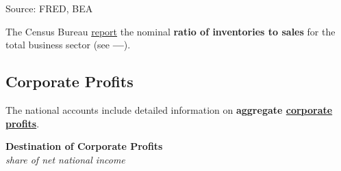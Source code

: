 \documentclass{report}
\makeatletter
\newcommand{\tbllink}[1]{\href{https://raw.githubusercontent.com/bdecon/US-chartbook/master/chartbook/data/#1}{\faTable}}
\newcommand*\short[1]{\expandafter\@gobbletwo\number\numexpr#1\relax}
\newcommand{\shdateaxisticks}{
		date coordinates in=x, axis line style={draw=none},
		xmax={2023-11-01},
		max space between ticks=40,	    
		xtick={{1990-01-01}, {1995-01-01}, {2000-01-01}, 
			{2005-01-01}, {2010-01-01}, {2015-01-01}, {2020-01-01}},
		minor xtick={},
		enlarge y limits={0.06}, enlarge x limits={0.01},
		}
\newcommand{\stdline}[4]{\addplot[very thick, no markers, color=#1] 
		table [x=#2, y=#3, col sep=comma] {#4};	}
\newcommand{\thinline}[4]{\addplot[no markers, color=#1] 
		table [x=#2, y=#3, col sep=comma] {#4};	}
\newcommand{\rbars}{
		\fill[color=black!10] (axis cs:{1990-07-01},\pgfkeysvalueof{/pgfplots/ymin}) rectangle 
			(axis cs:{1991-03-01}, \pgfkeysvalueof{/pgfplots/ymax});
		\fill[color=black!10] (axis cs:{2007-12-01},\pgfkeysvalueof{/pgfplots/ymin}) rectangle 
			(axis cs:{2009-07-01}, \pgfkeysvalueof{/pgfplots/ymax});
		\fill[color=black!10] (axis cs:{2001-03-01},\pgfkeysvalueof{/pgfplots/ymin}) rectangle 
			(axis cs:{2001-11-01}, \pgfkeysvalueof{/pgfplots/ymax});
		\fill[color=black!10] (axis cs:{2020-02-01},\pgfkeysvalueof{/pgfplots/ymin}) rectangle 
			(axis cs:{2020-05-01}, \pgfkeysvalueof{/pgfplots/ymax});}
\makeatother
\begin{document}
{\begin{minipage}{0.39\textwidth}
\hspace*{3mm} 

\footnotesize{Source: FRED, BEA} \hfill \tbllink{isratio.csv}
\end{minipage} \hspace{6mm}
\begin{minipage}{0.32\textwidth}
\small The Census Bureau \href{https://www.census.gov/mtis/www/data/pdf/mtis_current.pdf}{report} the nominal \textbf{ratio of inventories to sales} for the total business sector (see {\color{blue!40!cyan!80!white}\textbf{---}}). 
\end{minipage}
\newpage 
\hypertarget{buspr}{\label{buspr}}
\begin{minipage}{0.76\textwidth}   
\subsection*{Corporate Profits}
\small The national accounts include detailed information on \textbf{aggregate \href{https://www.bea.gov/data/income-saving/corporate-profits}{corporate profits}}.  
\vspace{1mm}

\normalsize \textbf{Destination of Corporate Profits}\\
\footnotesize{\textit{share of net national income}}
\vspace{3.5cm}


\end{minipage}}
\end{document}
